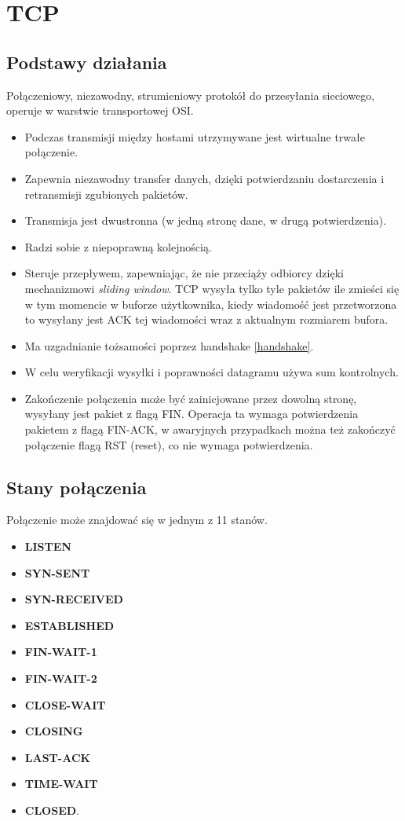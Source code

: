 \section{TCP}

\subsection{Podstawy działania}
Połączeniowy, niezawodny, strumieniowy protokół do przesyłania sieciowego, operuje w warstwie transportowej OSI.

\begin{itemize}
	\item Podczas transmisji między hostami utrzymywane jest wirtualne trwałe połączenie.
	\item Zapewnia niezawodny transfer danych, dzięki potwierdzaniu dostarczenia i retransmisji zgubionych pakietów.
	\item Transmisja jest dwustronna (w jedną stronę dane, w drugą potwierdzenia).
	\item Radzi sobie z niepoprawną kolejnością.
	\item Steruje przepływem, zapewniając, że nie przeciąży odbiorcy dzięki mechanizmowi \emph{sliding window}. TCP wysyła tylko tyle pakietów ile zmieści się w tym momencie w buforze użytkownika, kiedy wiadomość jest przetworzona to wysyłany jest ACK tej wiadomości wraz z aktualnym rozmiarem bufora.
	\item Ma uzgadnianie tożsamości poprzez handshake \ref{handshake}.
	\item W celu weryfikacji wysyłki i poprawności datagramu używa sum kontrolnych.
	\item Zakończenie połączenia może być zainicjowane przez dowolną stronę, wysyłany jest pakiet z flagą FIN. Operacja ta wymaga potwierdzenia pakietem z flagą FIN-ACK, w awaryjnych przypadkach można też zakończyć połączenie flagą RST (reset), co nie wymaga potwierdzenia.
\end{itemize}

\subsection{Stany połączenia}
Połączenie może znajdować się w jednym z 11 stanów.
\begin{multicols}{2}
	\begin{itemize}
		\item \textbf{LISTEN}
		\item \textbf{SYN-SENT}
		\item \textbf{SYN-RECEIVED}
		\item \textbf{ESTABLISHED}
		\item \textbf{FIN-WAIT-1}
		\item \textbf{FIN-WAIT-2}
		\item \textbf{CLOSE-WAIT}
		\item \textbf{CLOSING}
		\item \textbf{LAST-ACK}
		\item \textbf{TIME-WAIT}
		\item \textbf{CLOSED}.
	\end{itemize}
\end{multicols}

